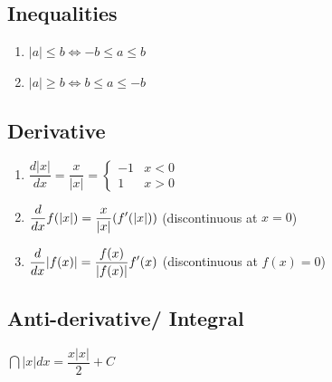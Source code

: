 \subsection*{Inequalities} \label{Basic Functions/Absolute Value function or Modulus Function/Inequalities}

\begin{enumerate}
    \item ${\displaystyle |a|\leq b\iff -b\leq a\leq b}$
    \hfill \cite{wiki/Absolute-value}

    \item ${\displaystyle |a|\geq b\iff b\leq a\leq -b\ }$
    \hfill \cite{wiki/Absolute-value}
\end{enumerate}

\subsection*{Derivative} \label{Basic Functions/Absolute Value function or Modulus Function/Derivative}

\begin{enumerate}
    \item $
        {\displaystyle {\dfrac {d\left|x\right|}{dx}}={\dfrac {x}{|x|}}={\begin{cases}-1&x<0\\1&x>0\end{cases}}}
    $
    \hfill \cite{wiki/Absolute-value}

    \item $
        {\displaystyle {d \over dx}f(|x|)={x \over |x|}(f'(|x|))}
    $ \hfill (discontinuous at $x=0$)
    \hfill \cite{wiki/Absolute-value}

    \item $
        {\displaystyle {d \over dx}|f(x)|={f(x) \over |f(x)|}f'(x)}
    $ \hfill (discontinuous at $f(x)=0$)
    \hfill \cite{wiki/Absolute-value}
\end{enumerate}


\subsection*{Anti-derivative/ Integral} \label{Basic Functions/Absolute Value function or Modulus Function/Anti-derivative or Integral}

$
    {\displaystyle \dint \left|x\right|dx={\dfrac {x\left|x\right|}{2}}+C}
$
\hfill \cite{wiki/Absolute-value}












